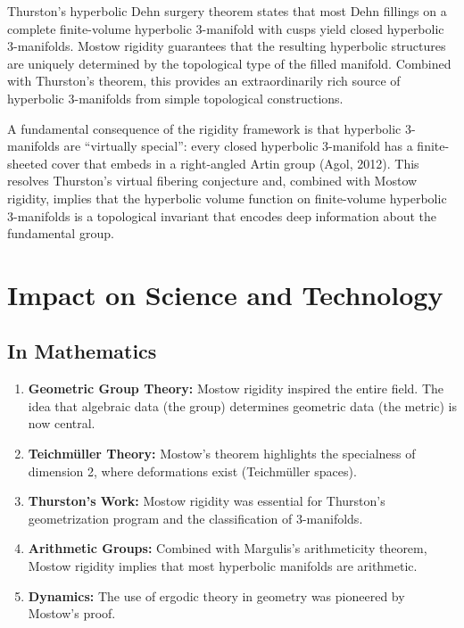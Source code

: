 \begin{remark}
Thurston's hyperbolic Dehn surgery theorem states that most Dehn fillings on a complete finite-volume hyperbolic 3-manifold with cusps yield closed hyperbolic 3-manifolds. Mostow rigidity guarantees that the resulting hyperbolic structures are uniquely determined by the topological type of the filled manifold. Combined with Thurston's theorem, this provides an extraordinarily rich source of hyperbolic 3-manifolds from simple topological constructions.
\end{remark}

\begin{remark}
A fundamental consequence of the rigidity framework is that hyperbolic 3-manifolds are ``virtually special'': every closed hyperbolic 3-manifold has a finite-sheeted cover that embeds in a right-angled Artin group (Agol, 2012). This resolves Thurston's virtual fibering conjecture and, combined with Mostow rigidity, implies that the hyperbolic volume function on finite-volume hyperbolic 3-manifolds is a topological invariant that encodes deep information about the fundamental group.
\end{remark}

\section{Impact on Science and Technology}

\subsection{In Mathematics}

\begin{enumerate}
    \item \textbf{Geometric Group Theory:} Mostow rigidity inspired the entire field. The idea that algebraic data (the group) determines geometric data (the metric) is now central.
    \item \textbf{Teichm\"uller Theory:} Mostow's theorem highlights the specialness of dimension 2, where deformations exist (Teichm\"uller spaces).
    \item \textbf{Thurston's Work:} Mostow rigidity was essential for Thurston's geometrization program and the classification of 3-manifolds.
    \item \textbf{Arithmetic Groups:} Combined with Margulis's arithmeticity theorem, Mostow rigidity implies that most hyperbolic manifolds are arithmetic.
    \item \textbf{Dynamics:} The use of ergodic theory in geometry was pioneered by Mostow's proof.
\end{enumerate}

